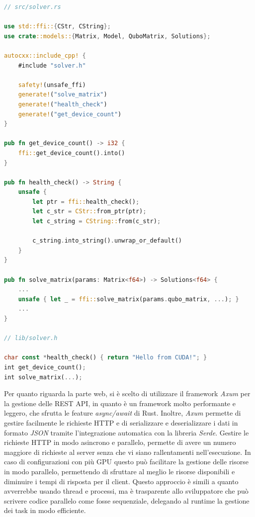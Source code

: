 \newpage
\vspace{5mm}
\begin{lstlisting}[language=Rust, caption=Macro autocxx e uso della FFI, label=lis:generic_glsl]
// src/solver.rs

use std::ffi::{CStr, CString};
use crate::models::{Matrix, Model, QuboMatrix, Solutions};

autocxx::include_cpp! {
    #include "solver.h"

    safety!(unsafe_ffi)
    generate!("solve_matrix")
    generate!("health_check")
    generate!("get_device_count")
}
    
pub fn get_device_count() -> i32 {
    ffi::get_device_count().into()
}

pub fn health_check() -> String {
    unsafe {
        let ptr = ffi::health_check();
        let c_str = CStr::from_ptr(ptr);
        let c_string = CString::from(c_str);

        c_string.into_string().unwrap_or_default()
    }
}

pub fn solve_matrix(params: Matrix<f64>) -> Solutions<f64> { 
    ...
    unsafe { let _ = ffi::solve_matrix(params.qubo_matrix, ...); }
    ...
}

// lib/solver.h

char const *health_check() { return "Hello from CUDA!"; }
int get_device_count();
int solve_matrix(...);
\end{lstlisting}
\vspace{5mm}


Per quanto riguarda la parte web, si è scelto di utilizzare il framework \textit{Axum} per la gestione delle REST API, in quanto è un framework molto performante e leggero, che sfrutta le feature \textit{async/await} di Rust. Inoltre, \textit{Axum} permette di gestire facilmente le richieste HTTP e di serializzare e deserializzare i dati in formato \textit{JSON} tramite l'integrazione automatica con la libreria \textit{Serde}. Gestire le richieste HTTP in modo asincrono e parallelo, permette di avere un numero maggiore di richieste al server senza che vi siano rallentamenti nell'esecuzione. In caso di configurazioni con più GPU questo può facilitare la gestione delle risorse in modo parallelo, permettendo di sfruttare al meglio le risorse disponibili e diminuire i tempi di risposta per il client. Questo approccio è simili a quanto avverrebbe usando thread e processi, ma è trasparente allo sviluppatore che può scrivere codice parallelo come fosse sequenziale, delegando al runtime la gestione dei task in modo efficiente.

